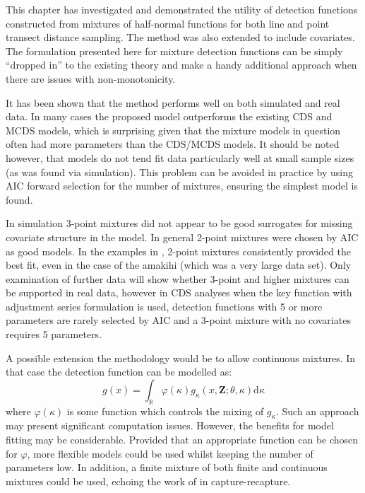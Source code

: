 This chapter has investigated and demonstrated the utility of detection functions constructed from mixtures of half-normal functions for both line and point transect distance sampling. The method was also extended to include covariates. The formulation presented here for mixture detection functions can be simply ``dropped in'' to the existing theory and make a handy additional approach when there are issues with non-monotonicity.

It has been shown that the method performs well on both simulated and real data. In many cases the proposed model outperforms the existing CDS and MCDS models, which is surprising given that the mixture models in question often had more parameters than the CDS/MCDS models. It should be noted however, that models do not tend fit data particularly well at small sample sizes (as was found via simulation). This problem can be avoided in practice by using AIC forward selection for the number of mixtures, ensuring the simplest model is found.

In simulation 3-point mixtures did not appear to be good surrogates for missing covariate structure in the model. In general 2-point mixtures were chosen by AIC as good models. In the examples in , 2-point mixtures consistently provided the best fit, even in the case of the amakihi (which was a very large data set). Only examination of further data will show whether 3-point and higher mixtures can be supported in real data, however in CDS analyses when the key function with adjustment series formulation is used, detection functions with 5 or more parameters are rarely selected by AIC and a 3-point mixture with no covariates requires 5 parameters.

A possible extension the methodology would be to allow continuous mixtures. In that case the detection function can be modelled as:
\begin{equation*}
g(x) = \int_\mathbb{R} \varphi(\kappa) g_\kappa(x,\mathbf{Z}; \theta, \kappa) \text{d}\kappa
\end{equation*}
where $\varphi(\kappa)$ is some function which controls the mixing of $g_\kappa$. Such an approach may present significant computation issues. However, the benefits for model fitting may be considerable. Provided that an appropriate function can be chosen for $\varphi$, more flexible models could be used whilst keeping the number of parameters low. In addition, a finite mixture of both finite and continuous mixtures could be used, echoing the work of  in capture-recapture.


